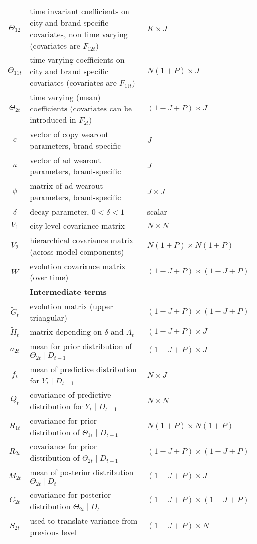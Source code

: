 \documentclass[letter,10pt]{article}
\begin{document}
\begin{table}[h]
\begin{tabular}{cp{4in}l}
$\Theta_{12}$&time invariant coefficients on city and brand specific covariates, non time varying (covariates are $F_{12t})$&$K\times J$\\
$\Theta_{11t}$&time varying coefficients on city and brand specific covariates (covariates are $F_{11t})$&$N(1+P)\times J$\\
$\Theta_{2t}$&time varying (mean) coefficients (covariates can be introduced in $F_{2t})$&$(1+J+P)\times J$\\
$c$&vector of copy wearout parameters, brand-specific&$J$\\
$u$&vector of ad wearout parameters, brand-specific&$J$\\
$\phi$&matrix of ad wearout parameters, brand-specific&$J\times J$\\
$\delta$&decay parameter, $0<\delta <1$&scalar\\
$V_1$&city level covariance matrix&$N\times N$\\
$V_2$&hierarchical covariance matrix (across model components)&$N(1+P)\times N(1+P)$\\
$W$&evolution covariance matrix (over time)&$(1+J+P)\times (1+J+P)$\\
\hline
&{\bf Intermediate terms}&\\
$\tilde{G}_t$&evolution matrix (upper triangular)&$(1+J+P)\times(1+J+P)$\\
$\tilde{H}_t$&matrix depending on $\delta$ and $A_t$&$(1+J+P)\times J$\\
$a_{2t}$&mean for prior distribution of $\Theta_{2t} \mid D_{t-1}$&$(1+J+P)\times J$\\
$f_t$&mean of predictive distribution for $Y_t\mid D_{t-1}$ &$N\times J$\\
$Q_t$&covariance of predictive distribution for $Y_t\mid D_{t-1}$&$N\times N$\\
$R_{1t}$&covariance for prior distribution of $\Theta_{1t}\mid D_{t-1}$&$N(1+P)\times N(1+P)$\\
$R_{2t}$&covariance for prior distribution of $\Theta_{2t}\mid D_{t-1}$&$(1+J+P)\times(1+J+P)$\\
$M_{2t}$&mean of posterior distribution $\Theta_{2t}\mid D_{t}$ &$(1+J+P)\times J$\\
$C_{2t}$&covariance for posterior distribution $\Theta_{2t}\mid D_{t}$ &$(1+J+P)\times (1+J+P)$\\
$S_{2t}$&used to translate variance from previous level &$(1+J+P)\times N$\\
\end{tabular}
\end{table}
\end{document}

